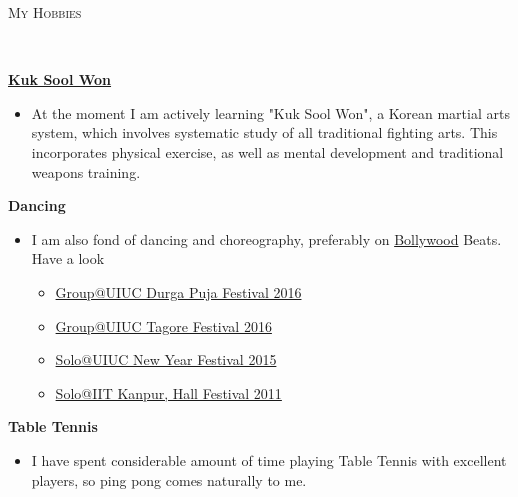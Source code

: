 \documentclass[9pt]{article}
\newenvironment{changemargin}[2]{%
  \begin{list}{}{%
    \setlength{\topsep}{0pt}%
    \setlength{\leftmargin}{#1}%
    \setlength{\rightmargin}{#2}%
    \setlength{\listparindent}{\parindent}%
    \setlength{\itemindent}{\parindent}%
    \setlength{\parsep}{\parskip}%
  }%
  \item[]}{\end{list}
}
\newcommand{\lineover}{
	\begin{changemargin}{-0.05in}{-0.05in}
		\vspace*{-8pt}
		\hrulefill \\
		\vspace*{-2pt}
	\end{changemargin}
}
\newcommand{\header}[1]{
	\begin{changemargin}{-0.5in}{-0.5in}
		\scshape{#1}\\
  	\lineover
	\end{changemargin}
}
\newenvironment{body} {
	\vspace*{-16pt}
	\begin{changemargin}{-0.25in}{-0.5in}
  }	
	{\end{changemargin}
}
\begin{document}
\smallskip


\smallskip

\header{My Hobbies}

\begin{body}
	\vspace{14pt}

	\href{https://en.wikipedia.org/wiki/Kuk\_Sool\_Won}{\textbf{Kuk Sool Won}}\\
	\vspace*{-4pt}
	\begin{itemize} \itemsep -0pt  %
                \item  

                  At the moment I am actively learning "Kuk Sool Won", a Korean
                  martial arts system, which involves systematic study of all
                  traditional fighting arts. This incorporates physical
                  exercise, as well as mental development and traditional
                  weapons training.
                  
                \end{itemize}

	\textbf{Dancing}\\
	\vspace*{-4pt}
	\begin{itemize} \itemsep -0pt  %
            \item I am also fond of dancing and choreography, preferably on \href{https://en.wikipedia.org/wiki/Bollywood}{Bollywood} Beats. Have a look
	        \begin{itemize} \itemsep -0pt  %
                    \item \href{https://www.youtube.com/watch?v=jx-HcAEbJaw&feature=youtu.be}{Group@UIUC Durga Puja Festival 2016}
                    \item \href{https://www.youtube.com/watch?v=PfqsE7sajm8&feature=youtu.be}{Group@UIUC Tagore Festival 2016}
                    \item \href{https://www.youtube.com/watch?v=XG6ViBPG7yE}{Solo@UIUC New Year Festival 2015}
                    \item \href{https://www.youtube.com/watch?v=F8xdb7LkSrw}{Solo@IIT Kanpur, Hall Festival 2011}
                \end{itemize}
         \end{itemize}

	\textbf{Table Tennis}\\
	\vspace*{-4pt}
	\begin{itemize} \itemsep -0pt  %
                \item  
                  I have spent considerable amount of time playing Table Tennis
                  with excellent players, so ping pong comes naturally  to me.
                \end{itemize}
\end{body}

\smallskip
\end{document}
